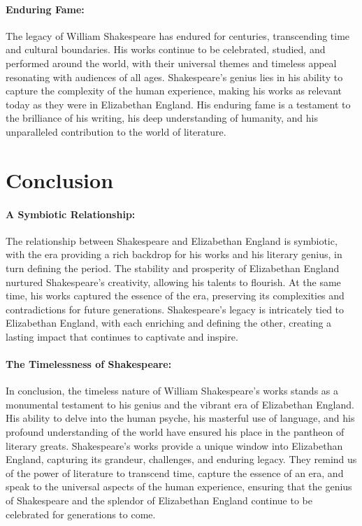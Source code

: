 \documentclass[a4paper,12pt]{book}
\begin{document}
\paragraph{Enduring Fame:}
The legacy of William Shakespeare has endured for centuries, transcending time and cultural boundaries. His works continue to be celebrated, studied, and performed around the world, with their universal themes and timeless appeal resonating with audiences of all ages. Shakespeare’s genius lies in his ability to capture the complexity of the human experience, making his works as relevant today as they were in Elizabethan England. His enduring fame is a testament to the brilliance of his writing, his deep understanding of humanity, and his unparalleled contribution to the world of literature.

\section*{Conclusion}

\paragraph{A Symbiotic Relationship:}
The relationship between Shakespeare and Elizabethan England is symbiotic, with the era providing a rich backdrop for his works and his literary genius, in turn defining the period. The stability and prosperity of Elizabethan England nurtured Shakespeare’s creativity, allowing his talents to flourish. At the same time, his works captured the essence of the era, preserving its complexities and contradictions for future generations. Shakespeare’s legacy is intricately tied to Elizabethan England, with each enriching and defining the other, creating a lasting impact that continues to captivate and inspire.

\paragraph{The Timelessness of Shakespeare:}
In conclusion, the timeless nature of William Shakespeare’s works stands as a monumental testament to his genius and the vibrant era of Elizabethan England. His ability to delve into the human psyche, his masterful use of language, and his profound understanding of the world have ensured his place in the pantheon of literary greats. Shakespeare’s works provide a unique window into Elizabethan England, capturing its grandeur, challenges, and enduring legacy. They remind us of the power of literature to transcend time, capture the essence of an era, and speak to the universal aspects of the human experience, ensuring that the genius of Shakespeare and the splendor of Elizabethan England continue to be celebrated for generations to come.
\end{document}

